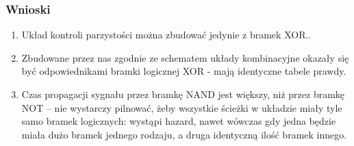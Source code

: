 \documentclass[12pt]{mwart}
\begin{document}
\subsubsection{Wnioski}
\begin{enumerate}
  \item Układ kontroli parzystości można zbudować jedynie z bramek XOR..
	\item Zbudowane przez nas zgodnie ze schematem układy kombinacyjne okazały się być odpowiednikami bramki logicznej XOR - mają identyczne tabele prawdy.
  \item Czas propagacji sygnału przez bramkę NAND jest większy, niż przez bramkę NOT -- nie wystarczy pilnować, żeby wszystkie ścieżki w układzie miały tyle samo bramek logicznych: wystąpi hazard, nawet wówczas gdy jedna będzie miała dużo bramek jednego rodzaju, a druga identyczną ilość bramek innego.
\end{enumerate}
\end{document}
